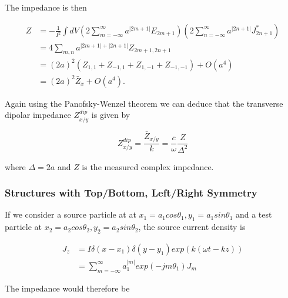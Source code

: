 The impedance is then

\begin{align}
Z & =  - \frac{1}{I^{2}} \int dV \left( 2\displaystyle\sum\limits_{m=-\infty}^{\infty} a^{|2m + 1 |} E_{2m + 1}  \right)  \left( 2\displaystyle\sum\limits_{n=-\infty}^{\infty} a^{|2n + 1 |} J_{2n + 1}^{*}  \right) \nonumber \\
& =  4 \displaystyle\sum\limits_{m,n} a^{|2m + 1 | + |2n + 1|} Z_{2m + 1, 2n+1} \nonumber \\
& =  \left(2a \right)^{2}\left( Z_{1,1} + Z_{-1,1} + Z_{1,-1} + Z_{-1,-1} \right) + O(a^{4}) \nonumber \\
& =  (2a)^{2}\bar{Z}_{x} + O(a^{4}). 
\end{align}

Again using the Panofsky-Wenzel theorem we can deduce that the transverse dipolar impedance $Z^{dip}_{x/y}$ is given by 

\begin{equation}
Z^{dip}_{x/y} = \frac{\bar{Z}_{x/y}}{k} = \frac{c}{\omega} \frac{Z}{\Delta^{2}}
\end{equation}

where $\Delta = 2a$ and $Z$ is the measured complex impedance.

\subsubsection{Structures with Top/Bottom, Left/Right Symmetry}

If we consider a source particle at at $x_{1} = a_{1}cos\theta_{1}, y_{1} = a_{1}sin\theta_{1}$ and a test particle at $x_{2} = a_{2}cos\theta_{2}, y_{2} = a_{2}sin\theta_{2}$, the source current density is

\begin{align}
J_{z} &= I\delta \left( x-x_{1} \right) \delta \left( y-y_{1} \right) exp \left( k \left( \omega t - kz \right) \right) \nonumber \\
          &=\displaystyle\sum\limits_{m=-\infty}^{\infty}a_{1}^{|m|}exp\left( -jm\theta_{1} \right) J_{m}
\end{align}

The impedance would therefore be

